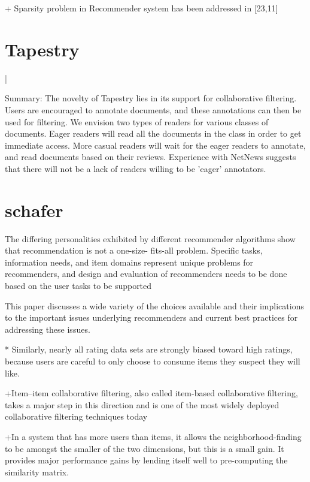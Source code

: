 + Sparsity problem in Recommender system has been addressed in [23,11]  


\section{Tapestry}
\cite{goldberg1992using}
\citeyear{goldberg1992using}|

Summary: 
The novelty of Tapestry lies in its support for collaborative
filtering. Users are encouraged to annotate documents,
and these annotations can then be used for filtering. We
envision two types of readers for various classes of
documents. Eager readers will read all the documents in
the class in order to get immediate access. More casual
readers will wait for the eager readers to annotate, and
read documents based on their reviews. Experience with
NetNews suggests that there will not be a lack of readers
willing to be ’eager’ annotators.

\section{schafer}
\cite{schafer2007collaborative}
\citeyear{schafer2007collaborative}

The differing personalities exhibited by different recommender
algorithms show that recommendation is not a one-size-
fits-all problem. Specific tasks, information needs, and item domains
represent unique problems for recommenders, and design and evaluation
of recommenders needs to be done based on the user tasks to
be supported

This paper discusses a wide variety of the choices available and their implications to the important issues underlying recommenders and current best practices for addressing these issues. 

* Similarly,
nearly all rating data sets are strongly biased toward high ratings,
because users are careful to only choose to consume items
they suspect they will like.

+Item–item collaborative filtering, also called item-based collaborative
filtering, takes a major step in this direction and is one of
the most widely deployed collaborative filtering techniques today

+In a system that has more
users than items, it allows the neighborhood-finding to be amongst the
smaller of the two dimensions, but this is a small gain. It provides
major performance gains by lending itself well to pre-computing the
similarity matrix.

